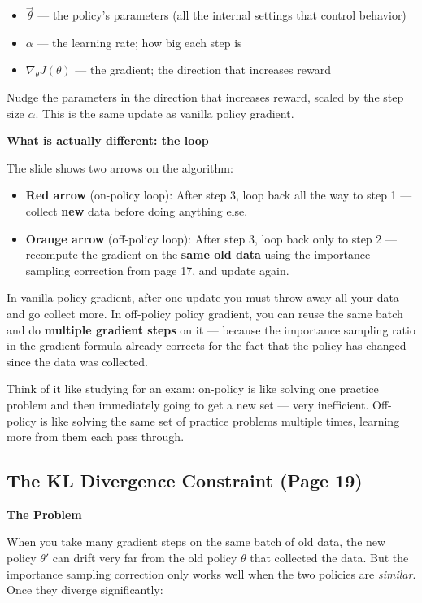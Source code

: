 \begin{itemize}
  \item $\vec{\theta}$ --- the policy's parameters (all the internal settings that control
    behavior)
  \item $\alpha$ --- the learning rate; how big each step is
  \item $\nabla_\theta J(\theta)$ --- the gradient; the direction that increases reward
\end{itemize}

Nudge the parameters in the direction that increases reward, scaled by the step size $\alpha$.
This is the same update as vanilla policy gradient.

\textbf{What is actually different: the loop}

The slide shows two arrows on the algorithm:

\begin{itemize}
  \item \textbf{Red arrow} (on-policy loop): After step 3, loop back all the way to step 1 ---
    collect \textbf{new} data before doing anything else.
  \item \textbf{Orange arrow} (off-policy loop): After step 3, loop back only to step 2 ---
    recompute the gradient on the \textbf{same old data} using the importance sampling correction
    from page 17, and update again.
\end{itemize}

In vanilla policy gradient, after one update you must throw away all your data and go collect more.
In off-policy policy gradient, you can reuse the same batch and do \textbf{multiple gradient steps}
on it --- because the importance sampling ratio in the gradient formula already corrects for the
fact that the policy has changed since the data was collected.

Think of it like studying for an exam: on-policy is like solving one practice problem and then
immediately going to get a new set --- very inefficient. Off-policy is like solving the same set
of practice problems multiple times, learning more from them each pass through.

\subsection{The KL Divergence Constraint (Page 19)}

\textbf{The Problem}

When you take many gradient steps on the same batch of old data, the new policy $\theta'$ can
drift very far from the old policy $\theta$ that collected the data. But the importance sampling
correction only works well when the two policies are \textit{similar}. Once they diverge
significantly:

